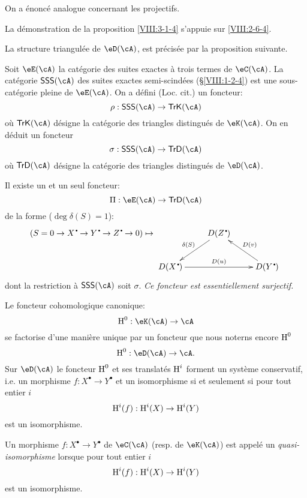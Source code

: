 On a \'enonc\'e analogue concernant les projectifs. 

La d\'emonstration de la proposition \ref{VIII:3-1-4} s'appuie sur 
\ref{VIII:2-6-4}. 

La structure triangul\'ee de $\eD(\cA)$, est pr\'ecis\'ee par la proposition 
suivante. 

Soit $\eE(\cA)$ la cat\'egorie des suites exactes \`a trois termes de 
$\eC(\cA)$. La cat\'egorie $\mathsf{SSS}(\cA)$ des suites exactes 
semi-scind\'ees (\S\ref{VIII:1-2-4}) est une sous-cat\'egorie pleine de 
$\eE(\cA)$. On a d\'efini (Loc. cit.) un foncteur: 
\[
  \rho:\mathsf{SSS}(\cA) \to \mathsf{TrK}(\cA) 
\]
o\`u $\mathsf{TrK}(\cA)$ d\'esigne la cat\'egorie des triangles distingu\'es 
de $\eK(\cA)$. On en d\'eduit un foncteur 
\[
  \sigma : \mathsf{SSS}(\cA) \to \mathsf{TrD}(\cA) 
\]
o\`u $\mathsf{TrD}(\cA)$ d\'esigne la cat\'egorie des triangles distingu\'es 
de $\eD(\cA)$. 





\begin{proposition}\label{VIII:3-1-5}
Il existe un et un seul foncteur: 
\[
  \Pi:\eE(\cA) \to \mathsf{TrD}(\cA) 
\]
de la forme ($\deg \delta(S)=1$): 
\[
(S=0 \to X^\bullet \to Y^\bullet \to Z^\bullet \to 0) 
\mapsto 
\xymatrix{
  & D(Z^\bullet) \ar[dl]_-{\delta(S)} \\
  D(X^\bullet) \ar[rr]^-{D(u)} 
    & & D(Y^\bullet) \ar[ul]_-{D(v)} 
}
\]
dont la restriction \`a $\mathsf{SSS}(\cA)$ soit $\sigma$. \emph{Ce foncteur 
est essentiellement surjectif.}
\end{proposition}





\begin{proposition}\label{VIII:3-1-6}
Le foncteur cohomologique canonique: 
\[
  \h^0:\eK(\cA) \to \cA 
\]
se factorise d'une mani\`ere unique par un foncteur que nous noterns encore 
$\operatorname{H}^0$ 
\[
  \h^0:\eD(\cA) \to \cA \text{.}
\]
Sur $\eD(\cA)$ le foncteur $\operatorname{H}^0$ et ses translat\'es $\operatorname{H}^i$ forment un 
syst\`eme conservatif, i.e. un morphisme $f:X^\bullet \to Y^\bullet$ et un 
isomorphisme si et seulement si pour tout entier $i$ 
\[
  \operatorname{H}^i(f):\operatorname{H}^i(X) \to \operatorname{H}^i(Y) 
\]
est un isomorphisme. 
\end{proposition}





\begin{definition}\label{VIII:3-1-7}
Un morphisme $f:X^\bullet \to Y^\bullet$ de $\eC(\cA)$ (resp. de $\eK(\cA)$) 
est appel\'e un \emph{quasi-isomorphisme} lorsque pour tout entier $i$ 
\[
  \operatorname{H}^i(f):\operatorname{H}^i(X) \to \operatorname{H}^i(Y) 
\]
est un isomorphisme. 
\end{definition}


